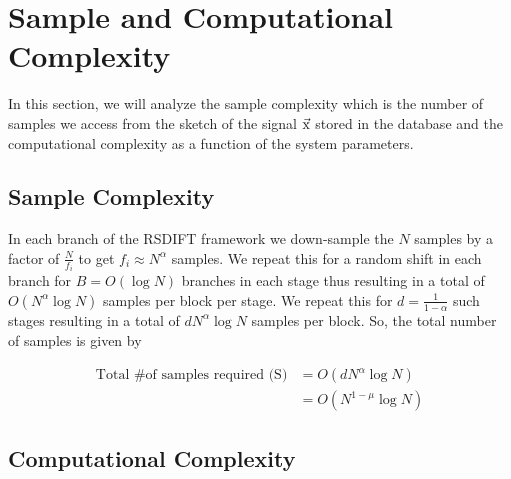 \section{Sample and Computational Complexity}
\label{Sec:Complexity}
In this section, we will analyze the sample complexity which is the  number of samples we access from the sketch of the signal $\vec{\mathrm{x}}$ stored in the database and the computational complexity as a function of the system parameters.

\subsection{\bf Sample Complexity}
In each branch of the RSDIFT framework we down-sample the $N$ samples by a factor of $\frac{N}{f_i}$ to get $f_i\approx N^{\alpha}$ samples. We repeat this for a random shift in each branch for $B=O(\log N)$ branches in each stage thus resulting in a total of $O(N^{\alpha}\log N)$ samples per block per stage. We repeat this for $d = \frac{1}{1-\alpha}$ such stages resulting in a total of $dN^{\alpha}\log N$ samples per block. So, the total number of samples is given by

\begin{align*}
\text{Total \# of samples required (S)} &= O \left(dN^{\alpha}\log N\right)\\
   &=   O(N^{1-\mu}\log N)
\end{align*}




\subsection{\bf Computational Complexity}

